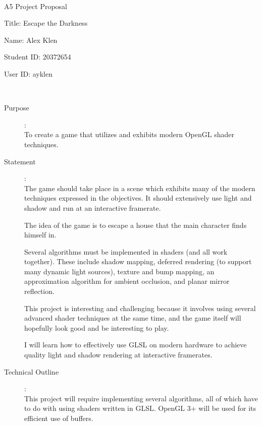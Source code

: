 \documentclass {article}
\begin{document}
~\vfill
\begin{center}
  \Large

  A5 Project Proposal

  Title: Escape the Darkness

  Name: Alex Klen

  Student ID: 20372654

  User ID: ayklen
\end{center}
\vfill ~\vfill~
\newpage
{}
\begin{description}
  \item[Purpose]:\\
    To create a game that utilizes and exhibits modern OpenGL shader techniques.

  \item[Statement]:\\
    The game should take place in a scene which exhibits many of the modern techniques expressed in the objectives.
    It should extensively use light and shadow and run at an interactive framerate.

    The idea of the game is to escape a house that the main character finds himself in.

    Several algorithms must be implemented in shaders (and all work together).
    These include shadow mapping, deferred rendering (to support many dynamic light sources), texture and bump mapping, an approximation algorithm for ambient occlusion, and planar mirror reflection.

    This project is interesting and challenging because it involves using several advanced shader techniques at the same time, and the game itself will hopefully look good and be interesting to play.

    I will learn how to effectively use GLSL on modern hardware to achieve quality light and shadow rendering at interactive framerates.

  \item[Technical Outline]:\\
    This project will require implementing several algorithms, all of which have to do with using shaders written in GLSL.
    OpenGL 3+ will be used for its efficient use of buffers.


\end{description}
\end{document}

